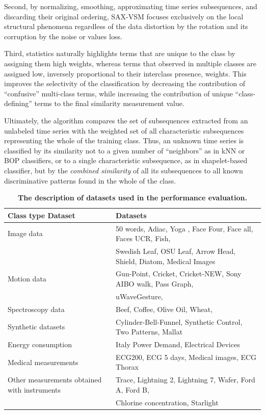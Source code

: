 Second, by normalizing, smoothing, approximating time series subsequences, and discarding their 
original ordering, SAX-VSM focuses exclusively on the local structural phenomena regardless of the 
data distortion by the rotation and its corruption by the noise or values loss.

Third,  \tfidf statistics naturally highlights terms that are unique to the class by assigning them high weights, 
whereas terms that observed in multiple classes are assigned low, 
inversely proportional to their interclass presence, weights. 
This improves the selectivity of the classification by decreasing the contribution of ``confusive'' multi-class terms, 
while increasing the contribution of unique ``class-defining'' terms to the final similarity measurement value.

Ultimately, the algorithm compares the set of subsequences extracted from an unlabeled time series 
with the weighted set of all characteristic subsequences representing the whole of the training class. 
Thus, an unknown time series is classified by its similarity not to a given number of 
``neighbors'' as in kNN or BOP classifiers, or to a single characteristic subsequence, as in shapelet-based classifier, 
but by the \textit{combined similarity} of all its subsequences to all known discriminative patterns found in the 
whole of the class.

\begin{table}[t]
\caption{\bf The description of datasets used in the performance evaluation.}
\vspace{0.4cm}
 \label{data_typetable1}
\centering
{\setlength{\extrarowheight}{2pt}%
{\footnotesize
\begin{tabularx}{\linewidth}{@{} l l @{}}
\hline
Class type Dataset & Datasets \\[0.5ex]
\hline
Image data & 50 words, Adiac, Yoga , Face Four, Face all, Faces UCR, Fish, \\
 & Swedish Leaf, OSU Leaf, Arrow Head, Shield, Diatom, Medical Images \\[0.5ex]
Motion data & Gun-Point, Cricket, Cricket-NEW, Sony AIBO walk, Pass Graph, \\ 
 & uWaveGesture, \\[0.5ex]
Spectroscopy data & Beef, Coffee, Olive Oil, Wheat, \\[0.5ex]
Synthetic datasets & Cylinder-Bell-Funnel, Synthetic Control, Two Patterns, Mallat \\[0.5ex]
Energy consumption & Italy Power Demand, Electrical Devices \\[0.5ex]
Medical measurements & ECG200, ECG 5 days, Medical images, ECG Thorax \\[0.5ex]
Other measurements obtained with instruments & Trace, Lightning 2, Lightning 7, Wafer, Ford A, Ford B, \\
 & Chlorine concentration, Starlight \\[0.5ex]
\hline
\end{tabularx}
}}
\end{table}

